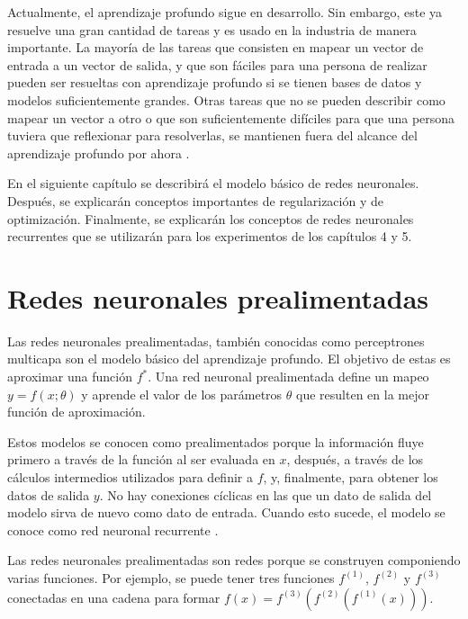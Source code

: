 \vspace{1em}

Actualmente, el aprendizaje profundo sigue en desarrollo. Sin embargo, este ya resuelve una gran cantidad de tareas y es usado en la industria de manera importante. La mayoría de las tareas que consisten en mapear un vector de entrada a un vector de salida, y que son fáciles para una persona de realizar pueden ser resueltas con aprendizaje profundo si se tienen bases de datos y modelos suficientemente grandes. Otras tareas que no se pueden describir como mapear un vector a otro o que son suficientemente difíciles para que una persona tuviera que reflexionar para resolverlas, se mantienen fuera del alcance del aprendizaje profundo por ahora \cite{goodfellow-et-al-2016}.

\vspace{1em}

En el siguiente capítulo se describirá el modelo básico de redes neuronales. Después, se explicarán conceptos importantes de regularización y de optimización. Finalmente, se explicarán los conceptos de redes neuronales recurrentes que se utilizarán para los experimentos de los capítulos 4 y 5.

\section{Redes neuronales prealimentadas}
Las redes neuronales prealimentadas, también conocidas como perceptrones multicapa son el modelo básico del aprendizaje profundo. El objetivo de estas es aproximar una función $f^*$. Una red neuronal prealimentada define un mapeo $y = f(x;\theta)$ y aprende el valor de los parámetros $\theta$ que resulten en la mejor función de aproximación. 

\vspace{1em}

Estos modelos se conocen como prealimentados porque la información fluye primero a través de la función al ser evaluada en $x$, después, a través de los cálculos intermedios utilizados para definir a $f$, y, finalmente, para obtener los datos de salida $y$. No hay conexiones cíclicas en las que un dato de salida del modelo sirva de nuevo como dato de entrada. Cuando esto sucede, el modelo se conoce como red neuronal recurrente \cite{goodfellow-et-al-2016}.

\vspace{1em}

Las redes neuronales prealimentadas son redes porque se construyen componiendo varias funciones. Por ejemplo, se puede tener tres funciones $f^{(1)}$, $f^{(2)}$ y $f^{(3)}$ conectadas en una cadena para formar $f(x) = f^{(3)}(f^{(2)}(f^{(1)}(x)))$.

